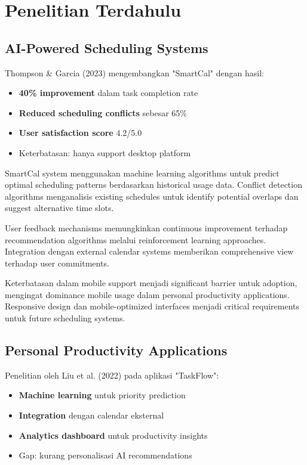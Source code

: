 \section{Penelitian Terdahulu}

\subsection{AI-Powered Scheduling Systems}

Thompson \& Garcia (2023) mengembangkan "SmartCal" dengan hasil:

\begin{itemize}
\item \textbf{40\% improvement} dalam task completion rate
\item \textbf{Reduced scheduling conflicts} sebesar 65\%
\item \textbf{User satisfaction score} 4.2/5.0
\item Keterbatasan: hanya support desktop platform
\end{itemize}

SmartCal system menggunakan machine learning algorithms untuk predict optimal scheduling patterns berdasarkan historical usage data. Conflict detection algorithms menganalisis existing schedules untuk identify potential overlaps dan suggest alternative time slots.

User feedback mechanisms memungkinkan continuous improvement terhadap recommendation algorithms melalui reinforcement learning approaches. Integration dengan external calendar systems memberikan comprehensive view terhadap user commitments.

Keterbatasan dalam mobile support menjadi significant barrier untuk adoption, mengingat dominance mobile usage dalam personal productivity applications. Responsive design dan mobile-optimized interfaces menjadi critical requirements untuk future scheduling systems.

\subsection{Personal Productivity Applications}

Penelitian oleh Liu et al. (2022) pada aplikasi "TaskFlow":

\begin{itemize}
\item \textbf{Machine learning} untuk priority prediction
\item \textbf{Integration} dengan calendar eksternal
\item \textbf{Analytics dashboard} untuk productivity insights
\item Gap: kurang personalisasi AI recommendations
\end{itemize}

